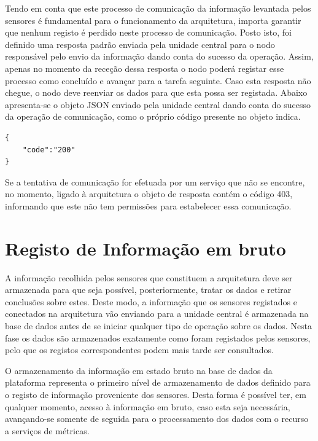 Tendo em conta que este processo de comunicação da informação levantada pelos sensores é fundamental para o funcionamento da arquitetura, importa garantir que nenhum registo é perdido neste processo de comunicação. Posto isto, foi definido uma resposta padrão enviada pela unidade central para o nodo responsável pelo envio da informação dando conta do sucesso da operação. Assim, apenas no momento da receção dessa resposta o nodo poderá registar esse processo como concluído e avançar para a tarefa seguinte. Caso esta resposta não chegue, o nodo deve reenviar os dados para que esta possa ser registada. Abaixo apresenta-se o objeto JSON enviado pela unidade central dando conta do sucesso da operação de comunicação, como o próprio código presente no objeto indica.\\

\begin{lstlisting}[caption=Mensagem de sucesso em JSON]
{
	"code":"200"
}
\end{lstlisting}


Se a tentativa de comunicação for efetuada por um serviço que não se encontre, no momento, ligado à arquitetura o objeto de resposta contém o código 403, informando que este não tem permissões para estabelecer essa comunicação.


\section{Registo de Informação em bruto}

A informação recolhida pelos sensores que constituem a arquitetura deve ser armazenada para que seja possível, posteriormente, tratar os dados e retirar conclusões sobre estes. Deste modo, a informação que os sensores registados e conectados na arquitetura vão enviando para a unidade central é armazenada na base de dados antes de se iniciar qualquer tipo de operação sobre os dados. Nesta fase os dados são armazenados exatamente como foram registados pelos sensores, pelo que os registos correspondentes podem mais tarde ser consultados.

O armazenamento da informação em estado bruto na base de dados da plataforma representa  o primeiro nível de armazenamento de dados definido para o registo de informação proveniente dos sensores. Desta forma é possível ter, em qualquer momento, acesso à informação em bruto, caso esta seja necessária, avançando-se somente de seguida para o processamento dos dados com o recurso a serviços de métricas. 

